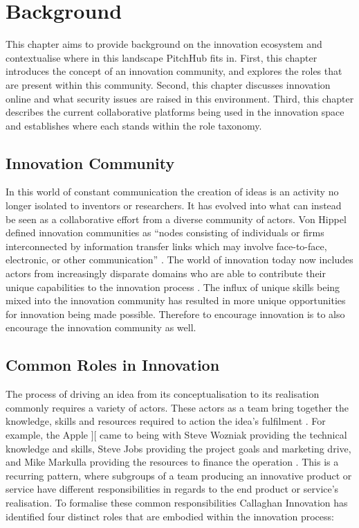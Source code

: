 \chapter{Background}\label{background}

This chapter aims to provide background on the innovation ecosystem and contextualise where in this landscape PitchHub fits in. First, this chapter introduces the concept of an innovation community, and explores the roles that are present within this community. Second, this chapter discusses innovation online and what security issues are raised in this environment. Third, this chapter describes the current collaborative platforms being used in the innovation space and establishes where each stands within the role taxonomy. 

\section{Innovation Community}
In this world of constant communication the creation of ideas is an activity no longer isolated to inventors or researchers. It has evolved into what can instead be seen as a collaborative effort from a diverse community of actors. Von Hippel defined innovation communities as ``nodes consisting of individuals or firms interconnected by information transfer links which may involve face-to-face, electronic, or other communication'' \cite{von2005democratizing}. The world of innovation today now includes actors from increasingly disparate domains who are able to contribute their unique capabilities to the innovation process \cite{che2003optimal}. The influx of unique skills being mixed into the innovation community has resulted in more unique opportunities for innovation being made possible. Therefore to encourage innovation is to also encourage the innovation community as well.

\section{Common Roles in Innovation}\label{commonRolesInInnovation}

The process of driving an idea from its conceptualisation to its realisation commonly requires a variety of actors. These actors as a team bring together the knowledge, skills and resources required to action the idea's fulfilment \cite{engelberger1982robotics}. For example, the Apple ][ came to being with Steve Wozniak providing the technical knowledge and skills, Steve Jobs providing the project goals and marketing drive, and Mike Markulla providing the resources to finance the operation \cite{livingston2007founders}. This is a recurring pattern, where subgroups of a team producing an innovative product or service have different responsibilities in regards to the end product or service's realisation. To formalise these common responsibilities Callaghan Innovation has identified four distinct roles that are embodied within the innovation process:

